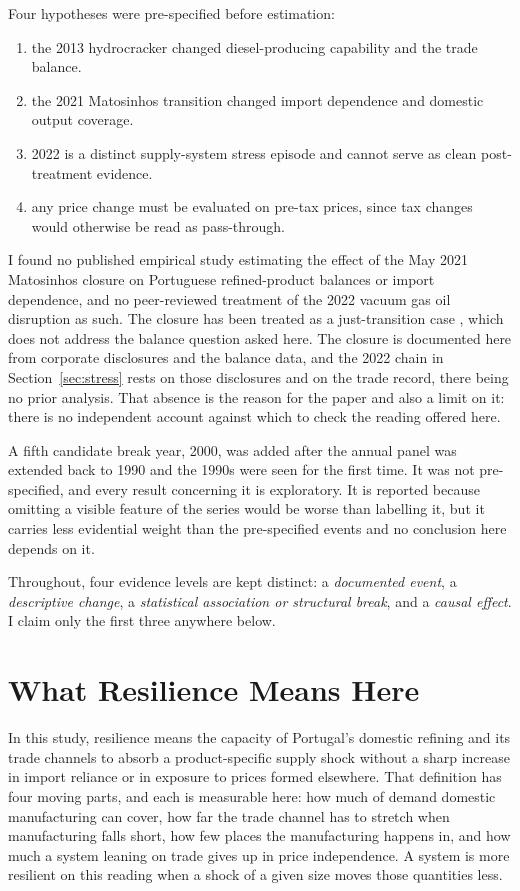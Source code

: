 \documentclass[11pt,a4paper]{article}
\begin{document}
Four hypotheses were pre-specified before estimation:

\begin{enumerate} \item the 2013 hydrocracker changed diesel-producing capability and the trade
balance. \item the 2021 Matosinhos transition changed import dependence and domestic output
coverage. \item 2022 is a distinct supply-system stress episode and cannot serve as clean post-treatment
evidence. \item any price change must be evaluated on pre-tax prices, since tax
changes would otherwise be read as pass-through. \end{enumerate}

I found no published empirical study estimating the effect of the May 2021 Matosinhos closure
on Portuguese refined-product balances or import dependence, and no peer-reviewed treatment of
the 2022 vacuum gas oil disruption as such. The closure has been treated as a just-transition
case \citep{serdoura2025matosinhos}, which does not address the balance question asked here. The closure is documented
here from corporate disclosures and the balance data, and the 2022 chain in
Section~\ref{sec:stress} rests on those disclosures and on the trade record, there being no
prior analysis. That absence is the reason for the paper and also a limit on it: there is no
independent account against which to check the reading offered here.

A fifth candidate break year, 2000, was added after the annual panel was extended back to 1990
and the 1990s were seen for the first time. It was not pre-specified, and every result
concerning it is exploratory. It is reported because omitting a visible feature of the series
would be worse than labelling it, but it carries less evidential weight than the pre-specified
events and no conclusion here depends on it.

Throughout, four evidence levels are kept distinct: a \emph{documented event}, a
\emph{descriptive change}, a \emph{statistical association or structural break}, and a
\emph{causal effect}. I claim only the first three anywhere below.

\section{What Resilience Means Here}
\label{sec:resilience}

In this study, resilience means the capacity of Portugal's domestic refining and its trade
channels to absorb a product-specific supply shock without a sharp increase in import reliance
or in exposure to prices formed elsewhere. That definition has four moving parts, and each is
measurable here: how much of demand domestic manufacturing can cover, how far the trade
channel has to stretch when manufacturing falls short, how few places the manufacturing
happens in, and how much a system leaning on trade gives up in price independence. A system is more resilient on this reading when a shock of a
given size moves those quantities less.
\end{document}
